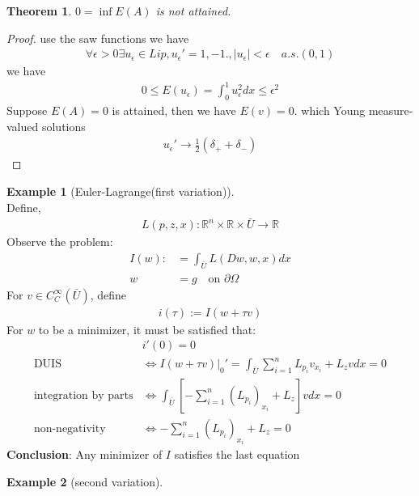 \documentclass[a4paper,12pt,oneside,fleqn]{book}
\newtheorem{theorem}{Theorem}[section]
\theoremstyle{definition}
\newtheorem*{example}{Example}
\theoremstyle{remark}
\begin{document}
\begin{theorem}
	$0 = \inf E(A)$ is not attained. 
\end{theorem}
\begin{proof}
	use the saw functions we have
	\begin{align*}
		\forall \epsilon > 0 \exists u_\epsilon \in Lip, u_\epsilon' = 1, -1. ,|u_\epsilon | < \epsilon \quad a.s. (0, 1)
	\end{align*}
	we have
	\begin{align*}
		0 \le E(u_\epsilon) = \int_0^1 u_\epsilon^2 dx \le \epsilon^2
	\end{align*}
	Suppose $E(A) = 0$ is attained, then we have $E(v) = 0$. which 
	Young measure-valued solutions
	\begin{align*}
		u_\epsilon' \rightarrow \frac{1}{2}(\delta_+ + \delta_-)
	\end{align*}
\end{proof}


\begin{example}[Euler-Lagrange(first variation)]\quad\\
Define,
\begin{align*}
	L(p, z, x): \mathbb{R}^n \times \mathbb{R} \times \bar{U} \rightarrow \mathbb{R}
\end{align*}
Observe the problem:
\begin{align*}
	I(w):&= \int_{\bar{U}} L(Dw, w, x) dx\\
		w &= g\quad \text{on } \partial \Omega	
\end{align*}
For $v \in C_C^\infty(\bar{U})$, define
\begin{align*}
	i(\tau):= I(w + \tau v)
\end{align*}
For $w$ to be a minimizer, it must be satisfied that:
\begin{align*}
	&i'(0) = 0 \\
	\text{DUIS}
 &\Leftrightarrow	I(w + \tau v)|_0' = \int_{\bar{U}} \sum_{i = 1}^n L_{p_i} v_{x_i} + L_z v  dx = 0\\
 \text{integration by parts}
 &\Leftrightarrow \int_{\bar{U}} [-\sum_{i = 1}^n (L_{p_i})_{x_i} + L_z]v dx = 0\\
 \text{non-negativity}
 &\Leftrightarrow -\sum_{i = 1}^n (L_{p_i})_{x_i} + L_z  = 0
\end{align*}
\textbf{Conclusion}: Any minimizer of $I$ satisfies the last equation
\end{example}



\begin{example}[second variation]
	
\end{example}
\end{document}
